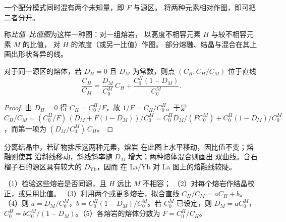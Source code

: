 一个配分模式同时混有两个未知量，即 $F$ 与源区。
将两种元素相对作图，即可把二者分开。

\begin{definition}[比值–比值图]\label{def:b3:trace-element-modelling:ratios}
称\emph{比值–比值图}为这样一种图：对一组熔岩，
以高度不相容元素 $H$ 与较不相容元素 $M$ 的比值，
对 $H$ 的浓度（或另一比值）作图。
部分熔融、结晶与混合在其上
画出形状各异的线。
\end{definition}

\begin{proposition}[批式熔融线]\label{prop:b3:trace-element-modelling:line}
对于同一源区的熔体，若 $D_H = 0$ 且 $D_M$ 为常数，则点
$(C_H, C_H/C_M)$ 位于直线
\[
\frac{C_H}{C_M} = \frac{D_M}{C_0^M}\,C_H + \frac{C_0^H(1 - D_M)}{C_0^M}.
\]
\end{proposition}

\begin{proof}
由 $D_H = 0$ 得 $C_H = C_0^H/F$，故 $1/F = C_H/C_0^H$。于是
$C_H/C_M = (C_0^H/F)\,(D_M + F(1 - D_M))/C_0^M = C_0^HD_M/(FC_0^M) +
C_0^H(1 - D_M)/C_0^M$，而第一项为 $(D_M/C_0^M)\,C_H$。
\end{proof}

分离结晶中，若矿物排斥这两种元素，熔岩
在此图上水平移动，因比值不变；熔融则使其
沿斜线移动，斜线斜率随 $D_M$ 增大；两种熔体混合则画出
双曲线。含石榴子石的源区具有较大的 $D_{\mathrm{Yb}}$，因而
在 La/Yb 对 La 图上的熔融线较陡。

\begin{method}[反演两个熔岩]\label{met:b3:trace-element-modelling:invert}
（1）检验这些熔岩是否同源，且 $H$ 远比 $M$ 不相容；
（2）对每个熔岩作结晶校正，或只用比值。
（3）利用两个或更多熔岩，拟合直线 $C_H/C_M = aC_H + b$。
（4）则 $a = D_M/C_0^M$，$b = C_0^H(1 - D_M)/C_0^M$。若 $C_0^M$ 已设定，则 $D_M =
aC_0^M$，$C_0^H = bC_0^M/(1 - D_M)$。（5）各熔岩的熔体分数为
$F = C_0^H/C_H$。
\end{method}

